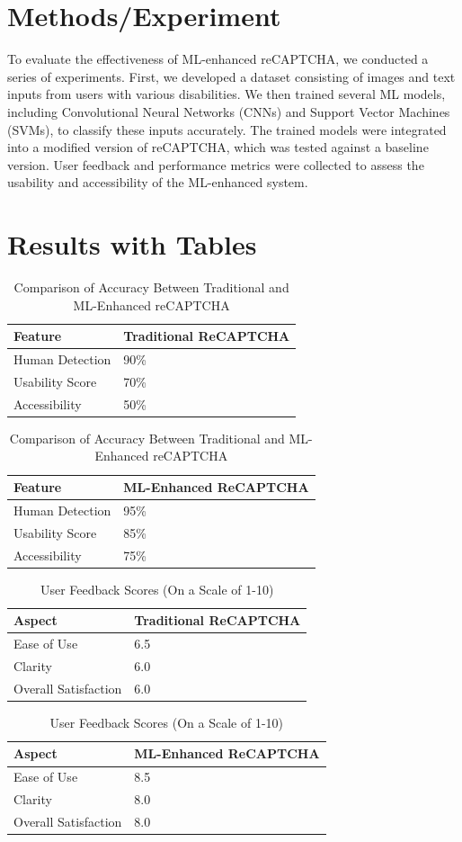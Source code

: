 \documentclass{article}
\begin{document}
\section{Methods/Experiment}
To evaluate the effectiveness of ML-enhanced reCAPTCHA, we conducted a series of experiments. First, we developed a dataset consisting of images and text inputs from users with various disabilities. We then trained several ML models, including Convolutional Neural Networks (CNNs) and Support Vector Machines (SVMs), to classify these inputs accurately. The trained models were integrated into a modified version of reCAPTCHA, which was tested against a baseline version. User feedback and performance metrics were collected to assess the usability and accessibility of the ML-enhanced system.

\section{Results with Tables}
\begin{table}[ht]
\centering
\caption{Comparison of Accuracy Between Traditional and ML-Enhanced reCAPTCHA}
\label{tab:accuracy}
\begin{tabular}{@{}ll@{}}
\toprule
Feature & Traditional ReCAPTCHA \\ \midrule
Human Detection & 90\% \\
Usability Score & 70\% \\
Accessibility & 50\% \\ \bottomrule
\end{tabular}
\begin{tabular}{@{}ll@{}}
\toprule
Feature & ML-Enhanced ReCAPTCHA \\ \midrule
Human Detection & 95\% \\
Usability Score & 85\% \\
Accessibility & 75\% \\ \bottomrule
\end{tabular}
\end{table}

\begin{table}[ht]
\centering
\caption{User Feedback Scores (On a Scale of 1-10)}
\label{tab:feedback}
\begin{tabular}{@{}ll@{}}
\toprule
Aspect & Traditional ReCAPTCHA \\ \midrule
Ease of Use & 6.5 \\
Clarity & 6.0 \\
Overall Satisfaction & 6.0 \\ \bottomrule
\end{tabular}
\begin{tabular}{@{}ll@{}}
\toprule
Aspect & ML-Enhanced ReCAPTCHA \\ \midrule
Ease of Use & 8.5 \\
Clarity & 8.0 \\
Overall Satisfaction & 8.0 \\ \bottomrule
\end{tabular}
\end{table}
\end{document}
